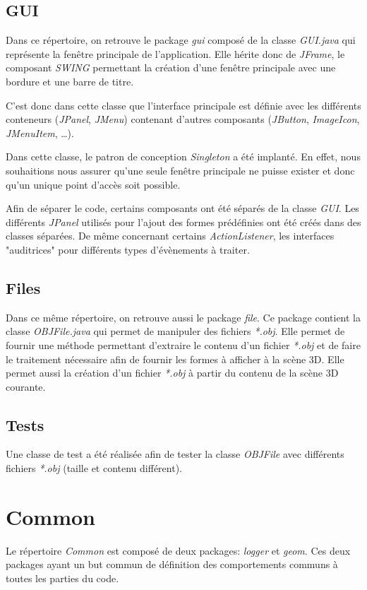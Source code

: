 \documentclass[11pt]{report}
\begin{document}
\subsection{GUI}
Dans ce répertoire, on retrouve le package \textit{gui} composé de la classe \textit{GUI.java} qui représente la fenêtre principale de l'application. Elle hérite donc de \textit{JFrame}, le composant \textit{SWING} permettant la création d'une fenêtre principale avec une bordure et une barre de titre.

C'est donc dans cette classe que l'interface principale est définie avec les différents conteneurs (\textit{JPanel}, \textit{JMenu}) contenant d'autres composants (\textit{JButton}, \textit{ImageIcon}, \textit{JMenuItem}, \ldots).

Dans cette classe, le patron de conception \textit{Singleton} a été implanté. En effet, nous souhaitions nous assurer qu'une seule fenêtre principale ne puisse exister et donc qu'un unique point d'accès soit possible.

Afin de séparer le code, certains composants ont été séparés de la classe \textit{GUI}. Les différents \textit{JPanel} utilisés pour l'ajout des formes prédéfinies ont été créés dans des classes séparées. De même concernant certains \textit{ActionListener}, les interfaces "auditrices" pour différents types d'évènements à traiter.


\subsection{Files}
Dans ce même répertoire, on retrouve aussi le package \textit{file}. Ce package contient la classe \textit{OBJFile.java} qui permet de manipuler des fichiers \textit{*.obj}. Elle permet de fournir une méthode permettant d'extraire le contenu d'un fichier \textit{*.obj} et de faire le traitement nécessaire afin de fournir les formes à afficher à la scène 3D.
Elle permet aussi la création d'un fichier \textit{*.obj} à partir du contenu de la scène 3D courante.

\subsection{Tests}

Une classe de test a été réalisée afin de tester la classe \textit{OBJFile} avec différents fichiers \textit{*.obj} (taille et contenu différent).

\section{Common}
Le répertoire \textit{Common} est composé de deux packages: \textit{logger} et \textit{geom}. Ces deux packages ayant un but commun de définition des comportements communs à toutes les parties du code.
\end{document}
